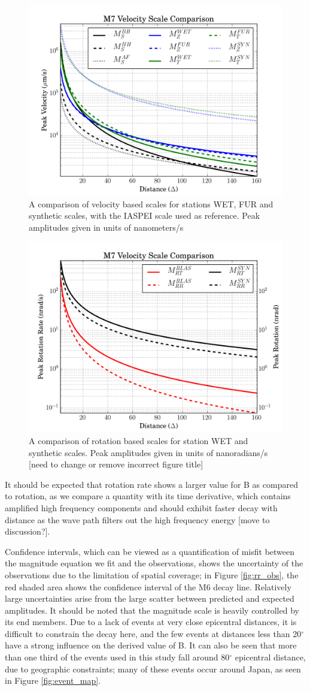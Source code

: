 \documentclass{gji}
\begin{document}
\begin{figure}
\centerline{\includegraphics[width=.5\textwidth]{velocityscales}}
\caption{A comparison of velocity based scales for stations WET, FUR and synthetic scales, with the IASPEI scale used as reference. Peak amplitudes given in units of nanometers/s}
\label{fig:vel_scale}
\end{figure}

\begin{figure}
\centerline{\includegraphics[width=.5\textwidth]{rrscales}}
\caption{A comparison of rotation based scales for station WET and synthetic scales. Peak amplitudes given in units of nanoradians/s [need to change or remove incorrect figure title]}
\label{fig:rr_scale}
\end{figure}

It should be expected that rotation rate shows a larger value for B as compared to rotation, as we compare a quantity with its time derivative, which contains amplified high frequency components and should exhibit faster decay with distance as the wave path filters out the high frequency energy [move to discussion?]. 

Confidence intervals, which can be viewed as a quantification of misfit between the magnitude equation we fit and the observations, shows the uncertainty of the observations due to the limitation of spatial coverage; in Figure \ref{fig:rr_obs}, the red shaded area shows the confidence interval of the M6 decay line. Relatively large uncertainties arise from the large scatter between predicted and expected amplitudes.%
It should be noted that the magnitude scale is heavily controlled by its end members. Due to a lack of events at very close epicentral distances, it is difficult to constrain the decay here, and the few events at distances less than 20$^\circ$ have a strong influence on the derived value of B. It can also be seen that more than one third of the events used in this study fall around 80$^\circ$ epicentral distance, due to geographic constraints; many of these events occur around Japan, as seen in Figure \ref{fig:event_map}.  
\end{document}
